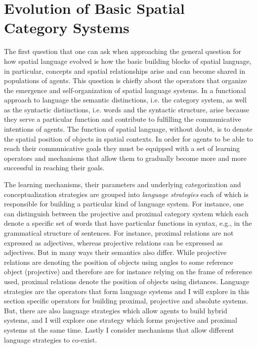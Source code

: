%


\chapter{Evolution of Basic Spatial Category Systems}
\label{s:lexical-systems}
The first question that one can ask when approaching the general question for
how spatial language evolved is how the basic building blocks of
spatial language, in particular, concepts and spatial relationships arise
and can become shared in populations of agents. This question is chiefly
about the operators that organize the emergence and self-organization of 
spatial language systems. In a functional approach to language the semantic distinctions, 
i.e. the category system, as well as the syntactic distinctions, i.e. words 
and the syntactic structure, arise because
they serve a particular function and contribute to fulfilling the communicative intentions
of agents. The function of spatial language, without doubt, is to denote the spatial position of 
objects in spatial contexts. In order for agents to be able to reach their
communicative goals they must be equipped with a set of learning operators and
mechanisms that allow them to gradually become more and more successful in
reaching their goals. 

The learning mechanisms, their parameters and underlying categorization 
and conceptualization strategies are grouped into \emph{language strategies} 
each of which is responsible for building a particular kind of language system. 
For instance, one can distinguish between the projective and proximal category 
system which each denote a specific set of words that have particular functions 
in syntax, e.g., in the grammatical structure of sentences. 
For instance, proximal relations are not expressed as adjectives, 
whereas projective relations can be expressed as adjectives. 
But in many ways their semantics also differ. While projective relations 
are denoting the position of objects using angles to some reference 
object (projective) and therefore are for instance relying on the frame of 
reference used, proximal relations denote the position of objects using distances. Language strategies are the operators
that form language systems and I will explore in this section specific operators for building
proximal, projective and absolute systems. But, there are also language strategies 
which allow agents to build hybrid systems, and I will explore one strategy 
which forms projective and proximal systems at the same time. Lastly I consider
mechanisms that allow different language strategies to co-exist.

